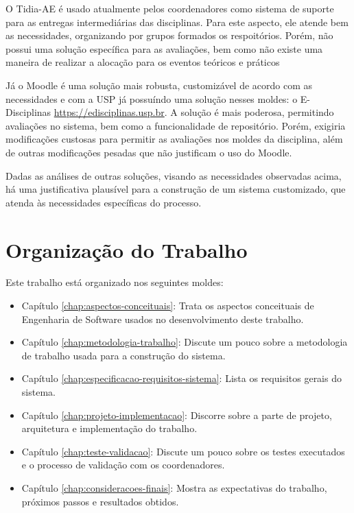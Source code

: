 O Tidia-AE é usado atualmente pelos coordenadores como sistema de suporte para as entregas intermediárias das disciplinas. Para este aspecto, ele atende bem as necessidades, organizando por grupos formados os respoitórios. Porém, não possui uma solução específica para as avaliações, bem como não existe uma maneira de realizar a alocação para os eventos teóricos e práticos

Já o Moodle é uma solução mais robusta, customizável de acordo com as necessidades e com a USP já possuíndo uma solução nesses moldes: o E-Disciplinas \href{https://edisciplinas.usp.br}{https://edisciplinas.usp.br}. A solução é mais poderosa, permitindo avaliações no sistema, bem como a funcionalidade de repositório. Porém, exigiria modificações custosas para permitir as avaliações nos moldes da disciplina, além de outras modificações pesadas que não justificam o uso do Moodle.

Dadas as análises de outras soluções, visando as necessidades observadas acima, há uma justificativa plausível para a construção de um sistema customizado, que atenda às necessidades específicas do processo.

\section{Organização do Trabalho}
Este trabalho está organizado nos seguintes moldes:

\begin{itemize}
    \item Capítulo \ref{chap:aspectos-conceituais}: Trata os aspectos conceituais de Engenharia de Software usados no desenvolvimento deste trabalho.
    \item Capítulo \ref{chap:metodologia-trabalho}: Discute um pouco sobre a metodologia de trabalho usada para a construção do sistema.
    \item Capítulo \ref{chap:especificacao-requisitos-sistema}: Lista os requisitos gerais do sistema.
    \item Capítulo \ref{chap:projeto-implementacao}: Discorre sobre a parte de projeto, arquitetura e implementação do trabalho.
    \item Capítulo \ref{chap:teste-validacao}: Discute um pouco sobre os testes executados e o processo de validação com os coordenadores.
    \item Capítulo \ref{chap:consideracoes-finais}: Mostra as expectativas do trabalho, próximos passos e resultados obtidos.
\end{itemize}

